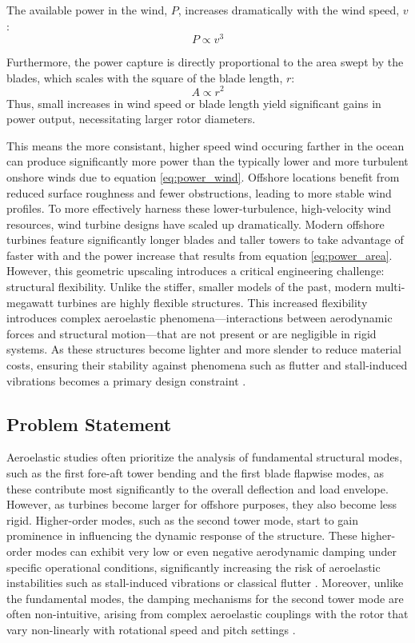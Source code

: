 \documentclass[onecolumn,draftcls]{IEEEtran}
\begin{document}
The available power in the wind, $P$, increases dramatically with the wind speed, $v$:
\begin{equation}
    \label{eq:power_wind}
    P \propto v^{3}
\end{equation}

Furthermore, the power capture is directly proportional to the area swept by the blades, which scales with the square of the blade length, $r$:
\begin{equation}
    \label{eq:power_area}
    A \propto r^{2}
\end{equation}
Thus, small increases in wind speed or blade length yield significant gains in power output, necessitating larger rotor diameters.

This means the more consistant, higher speed wind occuring farther in the ocean can produce significantly more power than the typically lower and more turbulent onshore winds due to equation \ref{eq:power_wind}. Offshore locations benefit from reduced surface roughness and fewer obstructions, leading to more stable wind profiles. To more effectively harness these lower-turbulence, high-velocity wind resources, wind turbine designs have scaled up dramatically. Modern offshore turbines feature significantly longer blades and taller towers to take advantage of faster with and the power increase that results from equation \ref{eq:power_area}.
However, this geometric upscaling introduces a critical engineering challenge: structural flexibility. Unlike the stiffer, smaller models of the past, modern multi-megawatt turbines are highly flexible structures. This increased flexibility introduces complex aeroelastic phenomena—interactions between aerodynamic forces and structural motion—that are not present or are negligible in rigid systems. As these structures become lighter and more slender to reduce material costs, ensuring their stability against phenomena such as flutter and stall-induced vibrations becomes a primary design constraint \cite{hansen2007aeroelastic}.


\subsection*{Problem Statement}
Aeroelastic studies often prioritize the analysis of fundamental structural modes, such as the first fore-aft tower bending and the first blade flapwise modes, as these contribute most significantly to the overall deflection and load envelope. However, as turbines become larger for offshore purposes, they also become less rigid. Higher-order modes, such as the second tower mode, start to gain prominence in influencing the dynamic response of the structure. These higher-order modes can exhibit very low or even negative aerodynamic damping under specific operational conditions, significantly increasing the risk of aeroelastic instabilities such as stall-induced vibrations or classical flutter \cite{hansen2007aeroelastic}. Moreover, unlike the fundamental modes, the damping mechanisms for the second tower mode are often non-intuitive, arising from complex aeroelastic couplings with the rotor that vary non-linearly with rotational speed and pitch settings \cite{hansen2007aeroelastic}.
\end{document}
